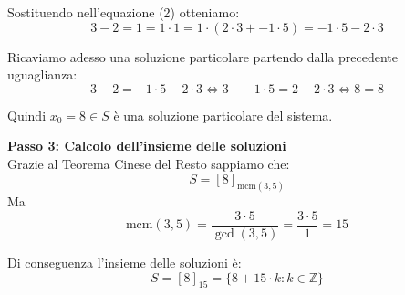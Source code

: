 \documentclass[12pt]{article}
\begin{document}
Sostituendo nell'equazione (2) otteniamo:
$$3 - 2 = 1 = 1 \cdot 1 = 1 \cdot (2 \cdot 3 + -1 \cdot 5) = -1 \cdot 5 - 2 \cdot 3$$

Ricaviamo adesso una soluzione particolare partendo dalla precedente uguaglianza:
$$3 - 2 = -1 \cdot 5 - 2 \cdot 3 \iff 3 - -1 \cdot 5 = 2 + 2 \cdot 3 \iff 8 = 8$$

Quindi $x_0 = 8 \in S$ è una soluzione particolare del sistema.


\textbf{Passo 3: Calcolo dell'insieme delle soluzioni} \\ 
Grazie al Teorema Cinese del Resto sappiamo che:
$$S = [8]_{\mathrm{mcm}(3, 5)}$$
Ma
$$\mathrm{mcm}({3}, {5}) = \frac{{3} \cdot {5}}{\gcd({3},{5})} = \frac{{3} \cdot {5}}{1} = {15}$$

Di conseguenza l'insieme delle soluzioni è:
        $$S = [8]_{15} = \{8 + 15 \cdot k : k \in \mathbb{Z}\}$$
        
\end{document}
